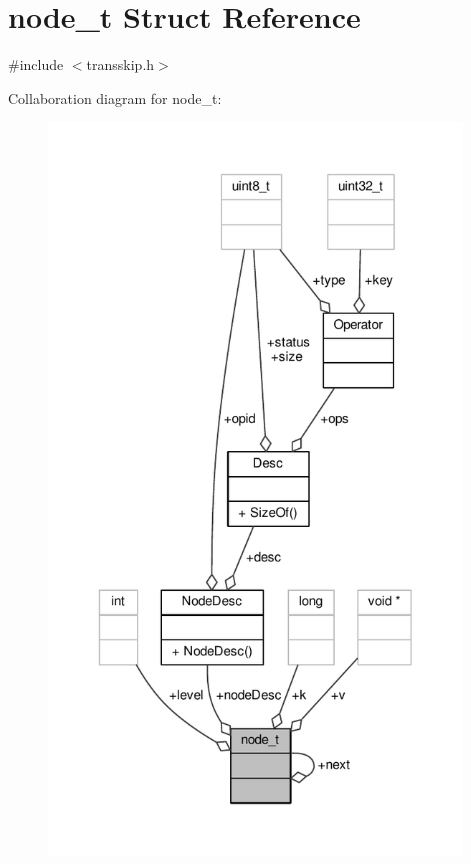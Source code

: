 \hypertarget{structnode__t}{\section{node\-\_\-t Struct Reference}
\label{structnode__t}
}


{\ttfamily \#include $<$transskip.\-h$>$}



Collaboration diagram for node\-\_\-t\-:
\nopagebreak
\begin{figure}[H]
\begin{center}
\leavevmode
\includegraphics[height=550pt]{structnode__t__coll__graph}
\end{center}
\end{figure}

